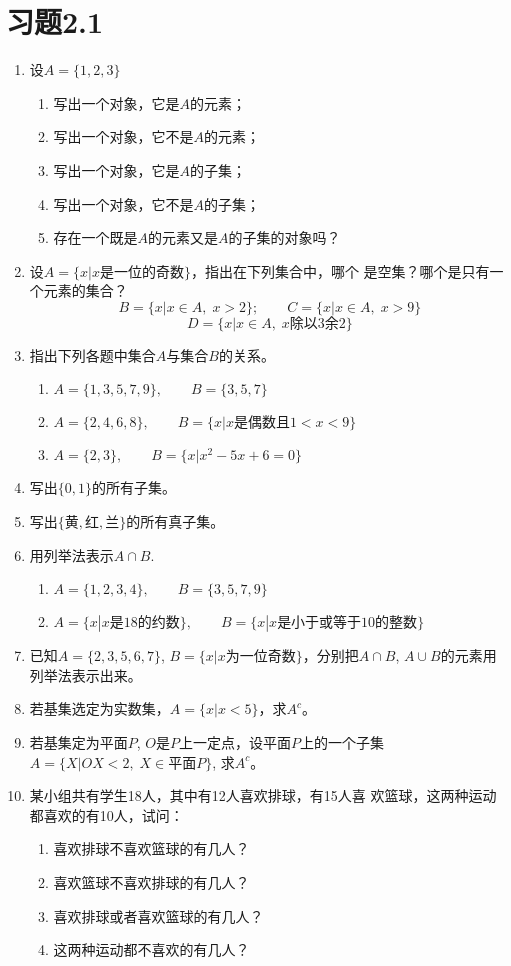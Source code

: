 \section*{习题2.1}
\begin{enumerate}
    \item 设$A=\{1, 2, 3\}$
\begin{enumerate}
    \item 写出一个对象，它是$A$的元素；
    \item 写出一个对象，它不是$A$的元素；
    \item 写出一个对象，它是$A$的子集；
    \item 写出一个对象，它不是$A$的子集；
    \item 存在一个既是$A$的元素又是$A$的子集的对象吗？
\end{enumerate}

\item 设$A=\{x|x\text{是一位的奇数}\}$，指出在下列集合中，哪个
是空集？哪个是只有一个元素的集合？
\[B=\{x|x\in A,\; x>2\};\qquad C=\{x|x\in A,\;x>9\}\]
\[D=\{x|x\in A,\;x\text{除以3余2}\}\]
\item 指出下列各题中集合$A$与集合$B$的关系。
\begin{enumerate}
    \item $A= \{1, 3, 5,7,9\},\qquad B=\{3,5,7\}$
    \item $A= \{2, 4, 6, 8\} ,\qquad B=\{x|x\text{是偶数且}1<x<9\}$
    \item $A= \{2, 3\} ,\qquad  B=\{x|x^2-5x+6=0\}$
\end{enumerate}

\item 写出$\{0, 1\}$的所有子集。
\item 写出$\{\text{黄},\text{红},\text{兰}\}$的所有真子集。
\item 用列举法表示$A\cap B$.
\begin{enumerate}
    \item $A= \{1, 2, 3, 4\} ,\qquad B= \{3, 5, 7, 9\}$
    \item $A=\{x|x\text{是18的约数}\},\qquad B=\{x|x\text{是小于或等于10的整数}\}$
\end{enumerate}

\item 已知$A=\{2, 3, 5, 6, 7\}$, $B=\{x|x\text{为一位奇数}\}$，分别把$A\cap B$, $A\cup B$的元素用列举法表示出来。
\item 若基集选定为实数集，$A=\{x|x<5\}$，求$A^c$。
\item 若基集定为平面$P$, $O$是$P$上一定点，设平面$P$上的一个子集$A=\{X|OX<2,\; X\in \text{平面}P\}$, 求$A^c$。
\item 某小组共有学生18人，其中有12人喜欢排球，有15人喜
欢篮球，这两种运动都喜欢的有10人，试问：
\begin{enumerate}
    \item 喜欢排球不喜欢篮球的有几人？   
     \item 喜欢篮球不喜欢排球的有几人？  
       \item 喜欢排球或者喜欢篮球的有几人？   
        \item 这两种运动都不喜欢的有几人？
\end{enumerate}
\end{enumerate}

